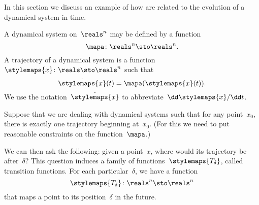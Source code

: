 
In this section we discuss an example of how  are related to the evolution of a dynamical system in time.

\label{exa:transition-functions}
\begin{definition}
    \label{def:ct-dynsyst}
    A dynamical system on~$\reals^n$ may be defined by a function
    \begin{equation}
        \mapa \colon \reals^n \sto \reals^n.
    \end{equation}
    A trajectory of a dynamical system is a function~$\stylemaps{x}\colon \reals \sto \reals^n$ such that
    \begin{equation}
        \dot{\stylemaps{x}}(t) = \mapa(\stylemaps{x}(t)).
    \end{equation}
    We use the notation~$\dot{\stylemaps{x}}$ to abbreviate~$\dd \stylemaps{x} / \dd t$.
\end{definition}

Suppose that we are dealing with dynamical systems such that for any point~$x_0$, there is exactly one trajectory beginning at~$x_0$.
(For this we need to put reasonable constraints on the function~$\mapa$.)

We can then ask the following: given a point~$x$, where would its trajectory be after~$\delta$?
This question induces a family of functions~$\stylemaps{T_\delta}$, called transition functions.
For each particular~$\delta$, we have a function
\begin{equation}
    \stylemaps{T_{\delta}}\colon \reals^n \sto \reals^n
\end{equation}
that maps a point to its position~$\delta$ in the future.

